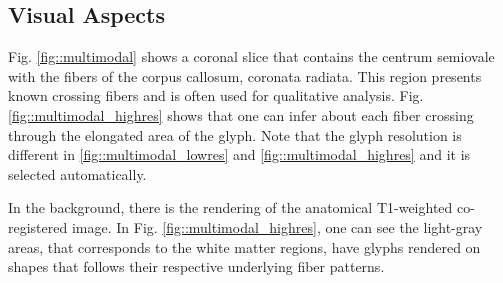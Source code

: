 \documentclass[twoside,twocolumn,10pt]{article}
\begin{document}
\subsection{Visual Aspects}




Fig. \ref{fig::multimodal} shows a coronal slice that contains the centrum semiovale with the fibers of the corpus callosum, coronata radiata. This region presents known crossing fibers and is often used for qualitative analysis. Fig. \ref{fig::multimodal_highres} shows that one can infer about each fiber crossing through the elongated area of the glyph. Note that the glyph resolution is different in \ref{fig::multimodal_lowres} and \ref{fig::multimodal_highres} and it is selected automatically.

In the background, there is the rendering of the anatomical T1-weighted co-registered image. In Fig. \ref{fig::multimodal_highres}, one can see the light-gray areas, that corresponds to the white matter regions, have glyphs rendered on shapes that follows their respective underlying fiber patterns.
\end{document}
